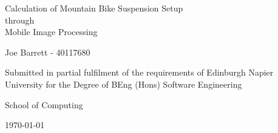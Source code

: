 \begin{titlepage}
	\begin{center}
		
		\vspace*{3cm}
		{\LARGE Calculation of Mountain Bike Suspension Setup\\through\\Mobile Image Processing}
		
		\vspace{3cm}
		{\large Joe Barrett - 40117680}

		\vfill
		Submitted in partial fulfilment of the requirements of Edinburgh Napier University for the Degree of BEng (Hons) Software Engineering
		
		\vspace{1cm}
		School of Computing
		
		\vspace{1cm}
		\today
	\end{center}
\end{titlepage}
